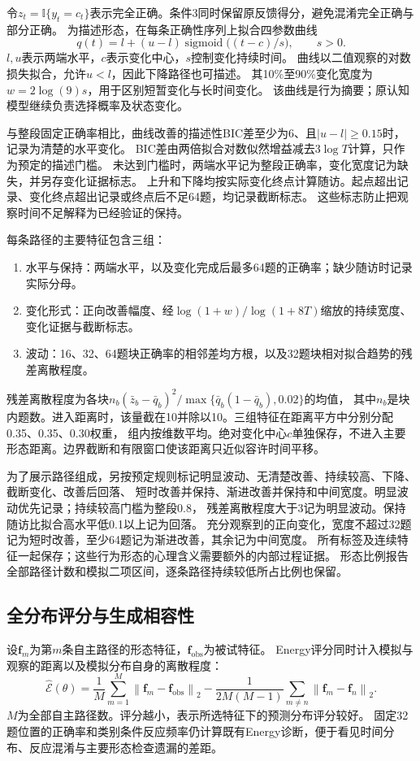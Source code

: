 \documentclass[11pt,a4paper]{article}
\numberwithin{equation}{section}
\newcommand{\ind}{\mathbb{I}}
\newcommand{\norm}[1]{\left\lVert#1\right\rVert}
\newcommand{\sigmoid}{\operatorname{sigmoid}}
\begin{document}
令$z_t=\ind\{y_t=c_t\}$表示完全正确。条件3同时保留原反馈得分，避免混淆完全正确与部分正确。
为描述形态，在每条正确性序列上拟合四参数曲线
\begin{equation}
q(t)=l+(u-l)\sigmoid\bigl((t-c)/s\bigr),\qquad s>0.
\label{eq:shape-sigmoid}
\end{equation}
$l,u$表示两端水平，$c$表示变化中心，$s$控制变化持续时间。
曲线以二值观察的对数损失拟合，允许$u<l$，因此下降路径也可描述。
其10\%至90\%变化宽度为$w=2\log(9)s$，用于区别短暂变化与长时间变化。
该曲线是行为摘要；原认知模型继续负责选择概率及状态变化。

与整段固定正确率相比，曲线改善的描述性BIC差至少为6、且$|u-l|\geq0.15$时，记录为清楚的水平变化。
BIC差由两倍拟合对数似然增益减去$3\log T$计算，只作为预定的描述门槛。
未达到门槛时，两端水平记为整段正确率，变化宽度记为缺失，并另存变化证据标志。
上升和下降均按实际变化终点计算随访。起点超出记录、变化终点超出记录或终点后不足64题，均记录截断标志。
这些标志防止把观察时间不足解释为已经验证的保持。

每条路径的主要特征包含三组：
\begin{enumerate}
\item 水平与保持：两端水平，以及变化完成后最多64题的正确率；缺少随访时记录实际分母。
\item 变化形式：正向改善幅度、经$\log(1+w)/\log(1+8T)$缩放的持续宽度、变化证据与截断标志。
\item 波动：16、32、64题块正确率的相邻差均方根，以及32题块相对拟合趋势的残差离散程度。
\end{enumerate}
残差离散程度为各块$n_b(\bar z_b-\bar q_b)^2/\max\{\bar q_b(1-\bar q_b),0.02\}$的均值，
其中$n_b$是块内题数。进入距离时，该量截在10并除以10。三组特征在距离平方中分别分配0.35、0.35、0.30权重，
组内按维数平均。绝对变化中心$c$单独保存，不进入主要形态距离。边界截断和有限窗口使该距离只近似容许时间平移。

为了展示路径组成，另按预定规则标记明显波动、无清楚改善、持续较高、下降、截断变化、改善后回落、
短时改善并保持、渐进改善并保持和中间宽度。明显波动优先记录；持续较高门槛为整段0.8，
残差离散程度大于3记为明显波动。保持随访比拟合高水平低0.1以上记为回落。
充分观察到的正向变化，宽度不超过32题记为短时改善，至少64题记为渐进改善，其余记为中间宽度。
所有标签及连续特征一起保存；这些行为形态的心理含义需要额外的内部过程证据。
形态比例报告全部路径计数和模拟二项区间，逐条路径持续较低所占比例也保留。

\subsection{全分布评分与生成相容性}
设$\bm f_m$为第$m$条自主路径的形态特征，$\bm f_{\mathrm{obs}}$为被试特征。
Energy评分同时计入模拟与观察的距离以及模拟分布自身的离散程度：
\begin{equation}
\widehat{\mathcal E}(\theta)=
\frac1M\sum_{m=1}^M\norm{\bm f_m-\bm f_{\mathrm{obs}}}_2
-\frac{1}{2M(M-1)}\sum_{m\ne n}\norm{\bm f_m-\bm f_n}_2.
\label{eq:energy}
\end{equation}
$M$为全部自主路径数。评分越小，表示所选特征下的预测分布评分较好。
固定32题位置的正确率和类别条件反应频率仍计算既有Energy诊断，便于看见时间分布、反应混淆与主要形态检查遗漏的差距。
\end{document}
